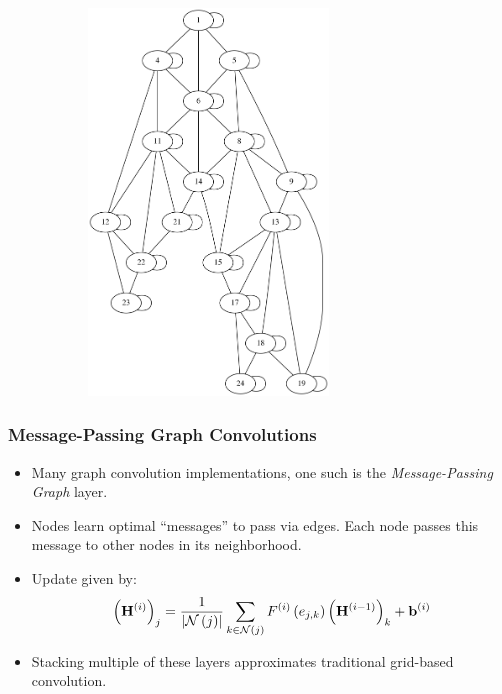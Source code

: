 \documentclass[handout]{beamer}
\renewcommand{\vec}[1]{ {\bf #1} }
\newcommand{\mat}[1]{ \vec{#1} }
\newcommand{\abs}[1]{ \left\lvert #1 \right\rvert }
\begin{document}
\begin{frame}
\begin{figure}[h]
\begin{subfigure}{.40\textwidth}
    \includegraphics[width=0.7\textwidth]{figures/graph.png}
  \end{subfigure}
\end{figure}
\end{frame}


\begin{frame}
  \frametitle{Message-Passing Graph Convolutions}
  \begin{itemize}
  \item Many graph convolution implementations, one such is the \textit{Message-Passing Graph} layer.
  \item Nodes learn optimal ``messages'' to pass via edges.  Each node passes this message to other nodes in its neighborhood.
  \item Update given by:
  \begin{equation*}\label{eqn:mpnn_prop}
    \left(\mat{H}^{(i)}\right)_j = \frac{1}{\abs{\mathcal{N}\left(j\right)}} \sum_{k\in\mathcal{N}\left(j\right)} F^{(i)}\left(e_{j,k}\right)\left(\mat{H}^{(i-1)}\right)_k + \vec{b}^{(i)}
  \end{equation*}
  \item Stacking multiple of these layers approximates traditional grid-based convolution.
  \end{itemize}
\end{frame}
\end{document}
